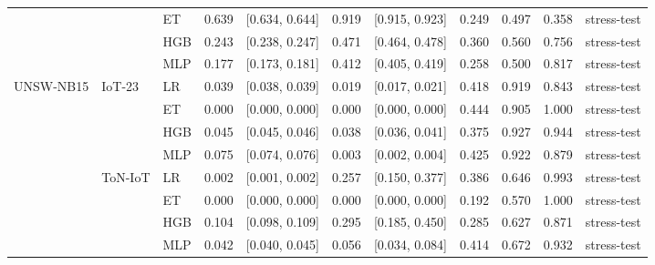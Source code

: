 \begin{table}[htbp]
{\begin{tabular}{lllrlrrrrll}
 &  & ET & 0.639 & [0.634, 0.644] & 0.919 & [0.915, 0.923] & 0.249 & 0.497 & 0.358 & stress-test \\
 &  & HGB & 0.243 & [0.238, 0.247] & 0.471 & [0.464, 0.478] & 0.360 & 0.560 & 0.756 & stress-test \\
 &  & MLP & 0.177 & [0.173, 0.181] & 0.412 & [0.405, 0.419] & 0.258 & 0.500 & 0.817 & stress-test \\
\midrule
UNSW-NB15 & IoT-23 & LR & 0.039 & [0.038, 0.039] & 0.019 & [0.017, 0.021] & 0.418 & 0.919 & 0.843 & stress-test \\
 &  & ET & 0.000 & [0.000, 0.000] & 0.000 & [0.000, 0.000] & 0.444 & 0.905 & 1.000 & stress-test \\
 &  & HGB & 0.045 & [0.045, 0.046] & 0.038 & [0.036, 0.041] & 0.375 & 0.927 & 0.944 & stress-test \\
 &  & MLP & 0.075 & [0.074, 0.076] & 0.003 & [0.002, 0.004] & 0.425 & 0.922 & 0.879 & stress-test \\
 & ToN-IoT & LR & 0.002 & [0.001, 0.002] & 0.257 & [0.150, 0.377] & 0.386 & 0.646 & 0.993 & stress-test \\
 &  & ET & 0.000 & [0.000, 0.000] & 0.000 & [0.000, 0.000] & 0.192 & 0.570 & 1.000 & stress-test \\
 &  & HGB & 0.104 & [0.098, 0.109] & 0.295 & [0.185, 0.450] & 0.285 & 0.627 & 0.871 & stress-test \\
 &  & MLP & 0.042 & [0.040, 0.045] & 0.056 & [0.034, 0.084] & 0.414 & 0.672 & 0.932 & stress-test \\
\bottomrule
\end{tabular}
}
\end{table}

